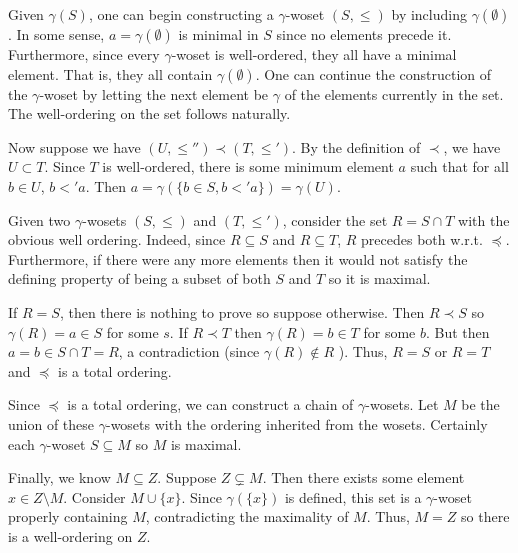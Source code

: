 \documentclass[../../master.tex]{subfiles}
\begin{document}
    \begin{solution}
        Given $\gamma(S)$, one can begin constructing a $\gamma$-woset $(S,
        \leq)$ by including $\gamma(\emptyset)$. In some sense, $a =
        \gamma(\emptyset)$ is minimal in $S$ since no elements precede it.
        Furthermore, since every $\gamma$-woset is well-ordered, they all have a
        minimal element. That is, they all contain $\gamma(\emptyset)$. One can
        continue the construction of the $\gamma$-woset by letting the next
        element be $\gamma$ of the elements currently in the set. The
        well-ordering on the set follows naturally.

        Now suppose we have $(U, \leq'') \prec (T, \leq')$. By the definition of
        $\prec$, we have $U \subset T$. Since $T$ is well-ordered, there is some
        minimum element $a$ such that for all $b \in U$, $b <' a$. Then $a =
        \gamma(\{b \in S, b <' a\}) = \gamma(U)$.

        Given two $\gamma$-wosets $(S, \leq)$ and $(T, \leq')$, consider the set
        $R = S \cap T$ with the obvious well ordering. Indeed, since $R
        \subseteq S$ and $R \subseteq T$, $R$ precedes both w.r.t. $\preceq$.
        Furthermore, if there were any more elements then it would not satisfy
        the defining property of being a subset of both $S$ and $T$ so it is
        maximal.

        If $R = S$, then there is nothing to prove so suppose otherwise. Then $R
        \prec S$ so $\gamma(R) = a \in S$ for some $s$. If $R \prec T$ then
        $\gamma(R) = b \in T$ for some $b$. But then $a = b \in S \cap T = R$, a
        contradiction (since $\gamma(R) \notin R$ ). Thus, $R = S$ or $R = T$
        and $\preceq$ is a total ordering.

        Since $\preceq$ is a total ordering, we can construct a chain of
        $\gamma$-wosets. Let $M$ be the union of these $\gamma$-wosets with the
        ordering inherited from the wosets. Certainly each $\gamma$-woset $S
        \subseteq M$ so $M$ is maximal.

        Finally, we know $M \subseteq Z$. Suppose $Z \subsetneq M$. Then there
        exists some element $x \in Z \setminus M$. Consider $M \cup \{x\}$.
        Since $\gamma(\{x\})$ is defined, this set is a $\gamma$-woset properly
        containing $M$, contradicting the maximality of $M$. Thus, $M = Z$ so
        there is a well-ordering on $Z$.
    \end{solution}
\end{document}
